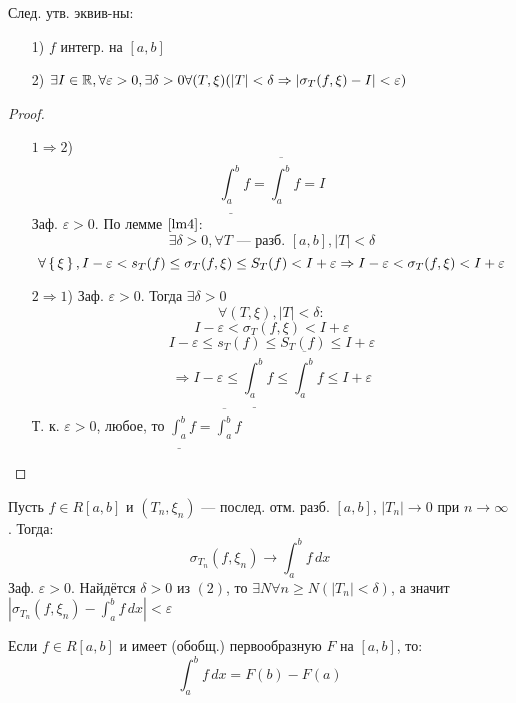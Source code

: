 \begin{theorem}
\label{th6:crit_Darbonapht}
След. утв. эквив-ны:
\begin{itemize}
  \item [1) ] $f$ интегр. на $[a, b]$
  \item [2) ] $\exists I \in \mathbb{R}, \forall \varepsilon > 0, \exists \delta > 0 \forall (T, \xi)(\left|T\right| < \delta \Rightarrow \left|\sigma_T(f, \xi) - I\right| < \varepsilon)$
\end{itemize}
\end{theorem}
\begin{proof}
\begin{itemize}
  \item [$1 \Rightarrow 2$)] \[
  \underline{\int_{a}^{b}} f = \overline{\int_{a}^{b}} f = I 
  \]
  Заф. $\varepsilon > 0$. По лемме $\ref{lm4}$:
  \[
  \exists \delta > 0, \forall T \text{ --- разб. $[a, b]$}, \left|T\right| < \delta
  \]
  \[
  \forall \set{\xi}, I - \varepsilon < s_T(f) \leq \sigma_T(f, \xi) \leq S_T(f) < I + \varepsilon \Rightarrow I - \varepsilon < \sigma_T(f, \xi) < I + \varepsilon
  \]
\item [$2 \Rightarrow 1$)] Заф. $\varepsilon > 0$. Тогда $\exists \delta > 0$
  \[
  \forall (T, \xi) , \left|T\right| < \delta \colon
  \]
  \[
  I - \varepsilon < \sigma_T(f, \xi) < I + \varepsilon
  \]
  \[
  I - \varepsilon \leq s_T(f) \leq S_T(f) \leq I + \varepsilon
  \]
  \[
  \Rightarrow I - \varepsilon \leq \underline{\int_{a}^{b}} f \leq \overline{\int_{a}^{b}} f \leq I + \varepsilon 
  \]
  Т. к. $\varepsilon > 0$, любое, то $\underline{\int_{a}^{b}} f = \overline{\int_{a}^{b}} f$
\end{itemize}
\end{proof}
\begin{consequence}
Пусть $f \in R[a, b]$ и $(T_n, \xi_n)$ --- послед. отм. разб. $[a, b]$, $\left|T_n\right| \rightarrow 0$ при $n \rightarrow \infty$. Тогда:
\[
\sigma_{T_n}(f, \xi_n) \rightarrow \int_{a}^{b} f \, dx
\]
Заф. $\varepsilon > 0$. Найдётся $\delta > 0$ из $(2)$, то $\exists N \forall n \geq N (\left|T_n\right| < \delta)$, а значит $\left|\sigma_{T_n}(f, \xi_n) - \int_{a}^{b} f \, dx\right| < \varepsilon$
\end{consequence}
\begin{theorem}
\label{th:Newton-Leibniz}
Если $f \in R[a, b]$ и имеет (обобщ.) первообразную $F$ на $[a, b]$, то:
\[
\int_{a}^{b} f \, dx = F(b) - F(a)
\]
\end{theorem}
